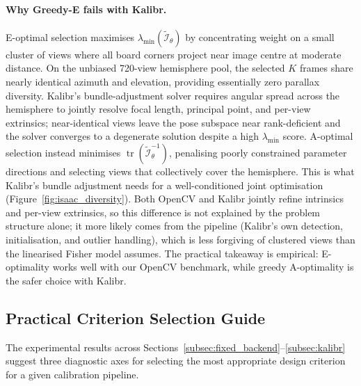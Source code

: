 \documentclass[letterpaper, 9
 pt, conference]{ieeeconf}
\begin{document}
\paragraph{Why Greedy-E fails with Kalibr.}
E-optimal selection maximises $\lambda_{\min}(\widetilde{\mathcal{I}}_\theta)$
by concentrating weight on a small cluster of views where all board corners
project near image centre at moderate distance.
On the unbiased 720-view hemisphere pool, the selected $K$ frames share
nearly identical azimuth and elevation, providing essentially zero parallax
diversity.
Kalibr's bundle-adjustment solver requires angular spread across the hemisphere
to jointly resolve focal length, principal point, and per-view extrinsics;
near-identical views leave the pose subspace near rank-deficient and the
solver converges to a degenerate solution despite a high $\lambda_{\min}$ score.
A-optimal selection instead minimises $\operatorname{tr}(\widetilde{\mathcal{I}}_\theta^{-1})$,
penalising poorly constrained parameter directions and selecting views that
collectively cover the hemisphere. This is what Kalibr's bundle adjustment
needs for a well-conditioned joint optimisation (Figure~\ref{fig:isaac_diversity}).
Both OpenCV and Kalibr jointly refine intrinsics and per-view extrinsics,
so this difference is not explained by the problem structure alone; it more
likely comes from the pipeline (Kalibr's own detection, initialisation, and
outlier handling), which is less forgiving of clustered views than the
linearised Fisher model assumes. The practical takeaway is empirical:
E-optimality works well with our OpenCV benchmark, while greedy A-optimality
is the safer choice with Kalibr.




\FloatBarrier

\subsection{Practical Criterion Selection Guide}
\label{subsec:criterion_guide}

The experimental results across Sections~\ref{subsec:fixed_backend}--\ref{subsec:kalibr}
suggest three diagnostic axes for selecting the most appropriate design criterion
for a given calibration pipeline.
\end{document}
